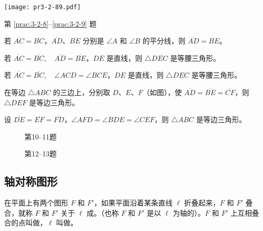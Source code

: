 \begin{Practice}
\begin{question}
\begin{figurehere}
\begin{minipage}[b]{0.45\linewidth}
    \texttt{[image: pr3-2-89.pdf]}
    \caption*{第 \ref{prac:3-2-8}--\ref{prac:3-2-9} 题}
  \end{minipage}
\end{figurehere}
\item\label{prac:3-2-9} 若 $\overline{AC}=\overline{BC}$，$\overline{AD}$、$\overline{BE}$ 分别是 $\angle A$ 和 $\angle B$ 的平分线，则 $\overline{AD}=\overline{BE}$。
\item 若 $\overline{AC}=\overline{BC},\quad \overline{AD}=\overline{BE}$，$DE$ 是直线，则 $\triangle DEC$ 是等腰三角形。
\item 若 $\overline{AC}=\overline{BC},\quad \angle ACD=\angle BCE$，$DE$ 是直线，则 $\triangle DEC$ 是等腰三角形。
\item 在等边 $\triangle ABC$ 的三边上，分别取 $D$、$E$、$F$（如图），使 $\overline{AD}=\overline{BE}=\overline{CF}$，则 $\triangle DEF$ 是等边三角形。
\item 设 $\overline{DE}=\overline{EF}=\overline{FD}$，$\angle AFD=\angle BDE=\angle CEF$，则 $\triangle ABC$ 是等边三角形。
\end{question}
\end{Practice}

\begin{figure}
    \begin{minipage}[t]{0.48\linewidth}
    \centering
{}
    \caption*{第10--11题}
    \end{minipage}
    \begin{minipage}[t]{0.48\linewidth}
    \centering
    \caption*{第12--13题}
    \end{minipage}
    \end{figure}

\subsection{轴对称图形}
\begin{Definition}
在平面上有两个图形 $F$ 和 $F'$，如果平面沿着某条直线 $\ell$ 折叠起来，$F$ 和 $F'$ 叠合，就称 $F$ 和 $F'$ 关于 $\ell$ 成。（也称 $F$ 和 $F'$ 是以 $\ell$ 为轴的）。$F$ 和 $F'$ 上互相叠合的点叫做，$\ell$ 叫做。
\end{Definition}

